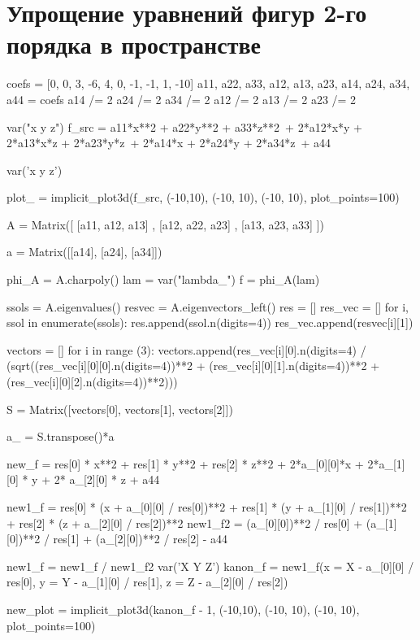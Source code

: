 \section{Упрощение уравнений фигур 2-го порядка в пространстве}

\begin{sagesilent}
	coefs = [0, 0, 3, -6, 4, 0, -1, -1, 1, -10]
	a11, a22, a33, a12, a13, a23, a14, a24, a34, a44 = coefs
	a14 /= 2 
	a24 /= 2
	a34 /= 2
	a12 /= 2
	a13 /= 2
	a23 /= 2
	
	var("x y z")
	f_src = a11*x**2 + a22*y**2 + a33*z**2\
	+ 2*a12*x*y + 2*a13*x*z + 2*a23*y*z\
	+ 2*a14*x + 2*a24*y + 2*a34*z\
	+ a44
	
	
	var('x y z')
	
	plot_ = implicit_plot3d(f_src, (-10,10), (-10, 10), (-10, 10), plot_points=100)
	
	A = Matrix([
	[a11, a12, a13]
	, [a12, a22, a23]
	, [a13, a23, a33]
	])
	
	a = Matrix([[a14], [a24], [a34]])
	
	phi_A = A.charpoly()
	lam = var("lambda_")
	f = phi_A(lam)
	
	ssols = A.eigenvalues()
	resvec = A.eigenvectors_left()
	res = []
	res_vec = []
	for i, ssol in enumerate(ssols):
	    res.append(ssol.n(digits=4))
	    res_vec.append(resvec[i][1])
	    
	vectors = []
	for i in range (3):
	    vectors.append(res_vec[i][0].n(digits=4) / (sqrt((res_vec[i][0][0].n(digits=4))**2 + (res_vec[i][0][1].n(digits=4))**2 + (res_vec[i][0][2].n(digits=4))**2)))
	    
	    
	S = Matrix([vectors[0], vectors[1], vectors[2]])
	
	a_ = S.transpose()*a

	new_f = res[0] * x**2 + res[1] * y**2 + res[2] * z**2 + 2*a_[0][0]*x + 2*a_[1][0] * y + 2* a_[2][0] * z + a44
	
	new1_f = res[0] * (x + a_[0][0] / res[0])**2 + res[1] * (y + a_[1][0] / res[1])**2 + res[2] * (z + a_[2][0] / res[2])**2
	new1_f2 = (a_[0][0])**2 / res[0] + (a_[1][0])**2 / res[1] + (a_[2][0])**2 / res[2] - a44
	
	new1_f = new1_f / new1_f2
	var('X Y Z')
	kanon_f = new1_f(x = X - a_[0][0] / res[0], y = Y - a_[1][0] / res[1], z = Z - a_[2][0] / res[2])	
	
	new_plot = implicit_plot3d(kanon_f - 1, (-10,10), (-10, 10), (-10, 10), plot_points=100)
	
	    
\end{sagesilent}

